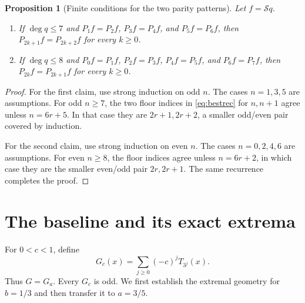 \documentclass[11pt]{article}
\newtheorem{proposition}[theorem]{Proposition}
\theoremstyle{remark}\newtheorem{remark}[theorem]{Remark}
\begin{document}
\begin{proposition}[Finite conditions for the two parity patterns]
\label{prop:finite}
Let $f=\mathcal S q$.
\begin{enumerate}
\item If $\deg q\le7$ and
$P_1f=P_2f$, $P_3f=P_4f$, and $P_5f=P_6f$, then
$P_{2k+1}f=P_{2k+2}f$ for every $k\ge0$.
\item If $\deg q\le8$ and
$P_0f=P_1f$, $P_2f=P_3f$, $P_4f=P_5f$, and $P_6f=P_7f$, then
$P_{2k}f=P_{2k+1}f$ for every $k\ge0$.
\end{enumerate}
\end{proposition}
\begin{proof}
For the first claim, use strong induction on odd $n$. The cases $n=1,3,5$
are assumptions. For odd $n\ge7$, the two floor indices in
\eqref{eq:bestrec} for $n,n+1$ agree unless $n=6r+5$. In that case they
are $2r+1,2r+2$, a smaller odd/even pair covered by induction.

For the second claim, use strong induction on even $n$. The cases
$n=0,2,4,6$ are assumptions. For even $n\ge8$, the floor indices agree
unless $n=6r+2$, in which case they are the smaller even/odd pair
$2r,2r+1$. The same recurrence completes the proof.
\end{proof}

\section{The baseline and its exact extrema}

For $0<c<1$, define
\[
 G_c(x)=\sum_{j\ge0}(-c)^j T_{3^j}(x).
\]
Thus $G=G_a$. Every $G_c$ is odd. We first establish the extremal geometry
for $b=1/3$ and then transfer it to $a=3/5$.
\end{document}
